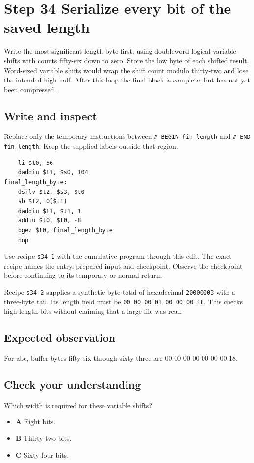 \section{Step 34 Serialize every bit of the saved length}\label{sha-s34}

Write the most significant length byte first, using doubleword logical variable shifts with counts fifty-six down to zero. Store the low byte of each shifted result. Word-sized variable shifts would wrap the shift count modulo thirty-two and lose the intended high half. After this loop the final block is complete, but has not yet been compressed.

\subsection{Write and inspect}
Replace only the temporary instructions between \texttt{\# BEGIN fin\_length} and \texttt{\# END fin\_length}. Keep the supplied labels outside that region.

\begin{verbatim}
    li $t0, 56
    daddiu $t1, $s0, 104
final_length_byte:
    dsrlv $t2, $s3, $t0
    sb $t2, 0($t1)
    daddiu $t1, $t1, 1
    addiu $t0, $t0, -8
    bgez $t0, final_length_byte
    nop
\end{verbatim}

Use recipe \texttt{s34-1} with the cumulative program through this edit. The exact recipe names the entry, prepared input and checkpoint. Observe the checkpoint before continuing to its temporary or normal return.

Recipe \texttt{s34-2} supplies a synthetic byte total of hexadecimal \texttt{20000003} with a three-byte tail. Its length field must be \texttt{00 00 00 01 00 00 00 18}. This checks high length bits without claiming that a large file was read.

\subsection{Expected observation}
For abc, buffer bytes fifty-six through sixty-three are 00 00 00 00 00 00 00 18.

\subsection{Check your understanding}
Which width is required for these variable shifts?

\begin{itemize}
\item \textbf{A} Eight bits.
\item \textbf{B} Thirty-two bits.
\item \textbf{C} Sixty-four bits.
\end{itemize}

